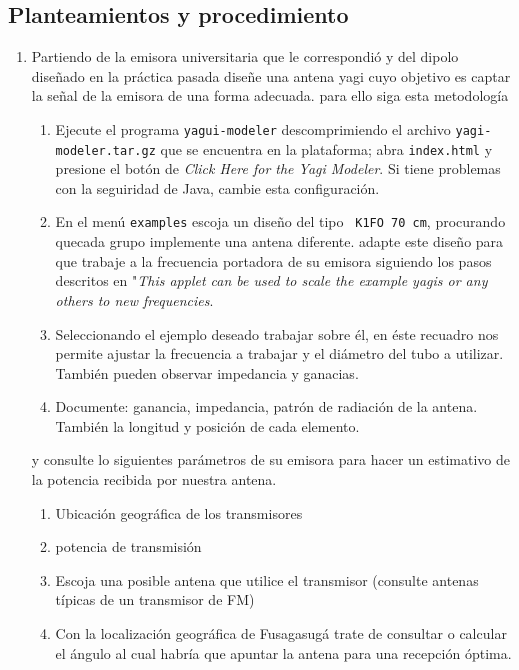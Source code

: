 \documentclass[onecolumn]{article}
\newcommand{\marco}[2]
{
{\fboxsep 10pt
    \begin{framed}

\section{#1}
#2
\end{framed}
}
}
\newcommand{\planteamiento}[1] { \marco{Planteamientos y procedimiento}{#1} }
\begin{document}
\planteamiento{

\begin{enumerate}


    \item Partiendo de la emisora universitaria que le correspondió y del
        dipolo diseñado en la práctica pasada diseñe una antena yagi cuyo
        objetivo es captar la señal de la emisora de una forma adecuada.
        para ello siga esta metodología \begin{enumerate}       
        \item Ejecute el programa {\tt yagui-modeler} descomprimiendo el
            archivo {\tt yagi-modeler.tar.gz} que se encuentra en la
            plataforma; abra {\tt index.html} y presione el botón de {\em
            Click Here for the Yagi Modeler}. Si tiene problemas con la
            seguiridad de Java, cambie esta configuración.

        \item  En el menú {\tt examples} escoja un diseño del tipo {\tt
            K1FO 70 cm}, procurando quecada grupo implemente una antena
            diferente. 
            adapte este diseño para que trabaje a la frecuencia portadora
            de su emisora siguiendo los pasos descritos en "{\em This
            applet can be used to scale the example yagis or any others to
        new frequencies}. 

        \item Seleccionando el ejemplo deseado trabajar sobre él, en éste
            recuadro nos permite ajustar la frecuencia  a trabajar y el
            diámetro del tubo a utilizar. También pueden observar
            impedancia y ganacias.

        \item Documente: ganancia, impedancia, patrón de radiación de la
            antena.  También la longitud y posición de cada elemento.

    \end{enumerate}
    y consulte lo siguientes parámetros de su emisora para hacer un
    estimativo de la potencia recibida por nuestra antena.

    \begin{enumerate}
        \item Ubicación geográfica de los transmisores
        \item potencia de transmisión 
        \item Escoja una posible antena que utilice el transmisor (consulte
            antenas típicas de un transmisor de FM)
        \item Con la localización geográfica de Fusagasugá trate de
            consultar o calcular
            el ángulo al cual habría que apuntar la antena para una
            recepción óptima.
    \end{enumerate}
   

\end{enumerate}}
\end{document}
